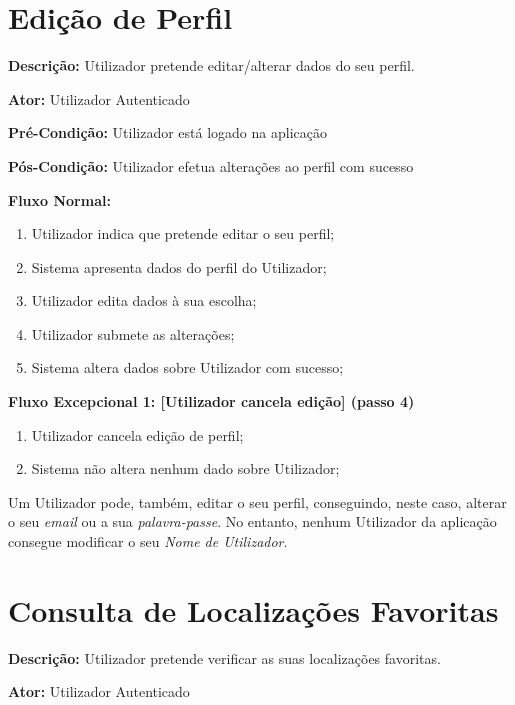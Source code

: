 \documentclass[a4paper,12pt]{scrreprt}
\newcommand{\tab}{
    \hspace{1cm}}
\begin{document}
\clearpage

\section{Edição de Perfil}

\textbf{Descrição: }Utilizador pretende editar/alterar dados do seu perfil.

\textbf{Ator: }Utilizador Autenticado

\textbf{Pré-Condição: }Utilizador está logado na aplicação

\textbf{Pós-Condição: }Utilizador efetua alterações ao perfil com sucesso

\textbf{Fluxo Normal: }
\begin{enumerate}
    \item Utilizador indica que pretende editar o seu perfil;
    \item Sistema apresenta dados do perfil do Utilizador;
    \item Utilizador edita dados à sua escolha;
    \item Utilizador submete as alterações;
    \item Sistema altera dados sobre Utilizador com sucesso;
\end{enumerate}

\textbf{Fluxo Excepcional 1: [Utilizador cancela edição] (passo 4)}
\begin{enumerate}[label=4.\arabic*]
    \item Utilizador cancela edição de perfil;
    \item Sistema não altera nenhum dado sobre Utilizador;
\end{enumerate}

\vspace{1.5cm}

\tab Um Utilizador pode, também, editar o seu perfil, conseguindo, neste caso, alterar o seu \emph{email} ou a sua \emph{palavra-passe}. No entanto, nenhum Utilizador da aplicação consegue modificar o seu \emph{Nome de Utilizador}.

\clearpage

\section{Consulta de Localizações Favoritas}

\textbf{Descrição: }Utilizador pretende verificar as suas localizações favoritas.

\textbf{Ator: }Utilizador Autenticado
\end{document}
